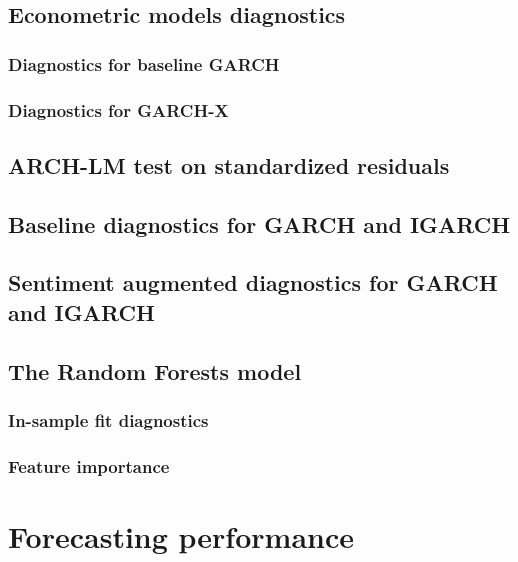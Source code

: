 \documentclass[12pt]{report}
\begin{document}
\subsection{Econometric models diagnostics}
\subsubsection{Diagnostics for baseline GARCH}

\subsubsection{Diagnostics for GARCH-X}

\subsection{ARCH-LM test on standardized residuals}

\subsection{Baseline diagnostics for GARCH and IGARCH}

\subsection{Sentiment augmented diagnostics for GARCH and IGARCH}

\subsection{The Random Forests model}
\subsubsection{In-sample fit diagnostics}

\subsubsection{Feature importance}


\section{Forecasting performance}
%
\end{document}
